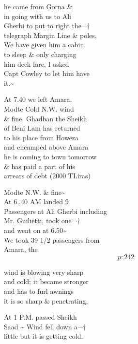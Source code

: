 \documentclass{report}
\begin{document}

	\par{
 	he came from Gorna \&\ \\in going with us to Ali\ \\Gherbi to put to right the¬†\ \\telegraph Margin Line \& poles,\ \\We have given him a cabin\ \\to sleep \& only charging\ \\him deck fare, I asked\ \\Capt Cowley to let him have\ \\it.\~{}\ \\
	}

	\par{
 	At 7.40 we left Amara,\ \\Modte Cold N.W. wind\ \\\& fine, Ghadban the Sheikh\ \\of Beni Lam has returned\ \\to his place from Howeza\ \\and encamped above Amara\ \\he is coming to town tomorrow\ \\\& has paid a part of his\ \\arrears of debt (2000 TLiras)\ \\
	}

	\par{
 	Modte N.W. \& fine\~{}\ \\At 6,,40 AM landed 9\ \\Passengers at Ali Gherbi including\ \\Mr. Guilietti, took one¬†\ \\and went on at 6.50\~{}\ \\We took 39 1/2 passengers from\ \\Amara, the\ \\
  \[p: 242 \]

	}

	\par{
 	wind is blowing very sharp\ \\and cold; it became stronger\ \\and has to furl awnings\ \\it is so sharp \& penetrating,\ \\
	}

	\par{
 	At 1 P.M. passed Sheikh\ \\Saad \~{} Wind fell down a¬†\ \\little but it is getting cold.\ \\
	}
\end{document}
